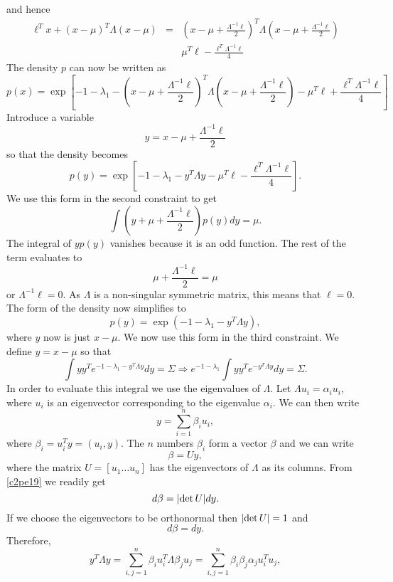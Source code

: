 \begin{enumerate}
and hence
\begin{eqnarray*}
\ell^Tx + (x-\mu)^T\Lambda(x-\mu) &=& \left(x-\mu+\frac{\Lambda^{-1}\ell}{2}\right)^T\Lambda\left(x-\mu+\frac{\Lambda^{-1}\ell}{2}\right) \\
 & & \mu^T\ell - \frac{\ell^T\Lambda^{-1}\ell}{4}
\end{eqnarray*}
The density $p$ can now be written as
\[
p(x)=\exp\left[-1-\lambda_1 - \left(x-\mu+\frac{\Lambda^{-1}\ell}{2}\right)^T\Lambda\left(x-\mu+\frac{\Lambda^{-1}\ell}{2}\right)-\mu^T\ell+\frac{\ell^T\Lambda^{-1}\ell}{4}\right]
\]
Introduce a variable 
\[
y = x - \mu + \frac{\Lambda^{-1}\ell}{2}
\]
so that the density becomes
\[
p(y) = \exp\left[-1-\lambda_1-y^T\Lambda y - \mu^T\ell - \frac{\ell^T\Lambda^{-1}\ell}{4}\right].
\]
We use this form in the second constraint to get
\[
\int\left(y + \mu + \frac{\Lambda^{-1}\ell}{2}\right)p(y)dy = \mu.
\]
The integral of $yp(y)$ vanishes because it is an odd function. The rest of the term evaluates to
\[
\mu + \frac{\Lambda^{-1}\ell}{2} = \mu
\]
or $\Lambda^{-1}\ell = 0$. As $\Lambda$ is a non-singular symmetric matrix, this means that $\ell = 0$.
The form of the density now simplifies to
\[
p(y) = \exp\left(-1 - \lambda_1 - y^T\Lambda y\right),
\]
where $y$ now is just $x - \mu$. We now use this form in the third constraint. We define 
$y = x - \mu$ so that
\begin{equation}\label{c2pe18}
\int yy^Te^{-1 - \lambda_1 - y^T\Lambda y}dy = \Sigma \Rightarrow e^{-1-\lambda_1} \int yy^T e^{-y^T\Lambda y}dy = \Sigma.
\end{equation}
In order to evaluate this integral we use the eigenvalues of $\Lambda$. Let $\Lambda u_i = \alpha_i u_i$,
where $u_i$ is an eigenvector corresponding to the eigenvalue $\alpha_i$. We can then write 
\[
y = \sum_{i=1}^n \beta_i u_i,
\]
where $\beta_i = u_i^T y = (u_i, y)$. The $n$ numbers $\beta_i$ form a vector $\beta$ and we can write
\begin{equation}\label{c2pe19}
\beta = Uy,
\end{equation}
where the matrix $U = [u_1 \ldots u_n]$ has the eigenvectors of $\Lambda$ as its columns. From \eqref{c2pe19}
we readily get 
\begin{equation}\label{c2pe20}
d\beta = \lvert\det U\rvert dy.
\end{equation}
If we choose the eigenvectors to be orthonormal then $\lvert\det U\rvert = 1$ and 
\begin{equation}\label{c2pe21}
d\beta = dy.
\end{equation}
Therefore,
\[
y^T\Lambda y = \sum_{i,j=1}^n \beta_i u_i^T \Lambda \beta_j u_j = \sum_{i,j=1}^n \beta_i\beta_j\alpha_j u_i^T u_j,
\]
\end{enumerate}
